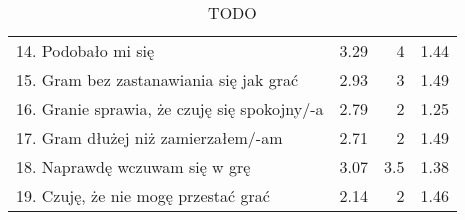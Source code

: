 \begin{table}[h!]
\begin{center}
\begin{tabular}{|m{10em}|r|r|r|}
            14. Podobało mi się                                               & 3.29          & 4       & 1.44           \\
            15. Gram bez zastanawiania się jak grać                           & 2.93          & 3       & 1.49           \\
            16. Granie sprawia, \newline że czuję się spokojny/-a             & 2.79          & 2       & 1.25           \\
            17. Gram dłużej \newline niż zamierzałem/-am                      & 2.71          & 2       & 1.49           \\
            18. Naprawdę wczuwam się w grę                                    & 3.07          & 3.5     & 1.38           \\
            19. Czuję, że nie mogę przestać grać                              & 2.14          & 2       & 1.46           \\
            \hline
        \end{tabular}
    \end{center}
    \caption{TODO}\label{tab1:ch7_8}
\end{table}

